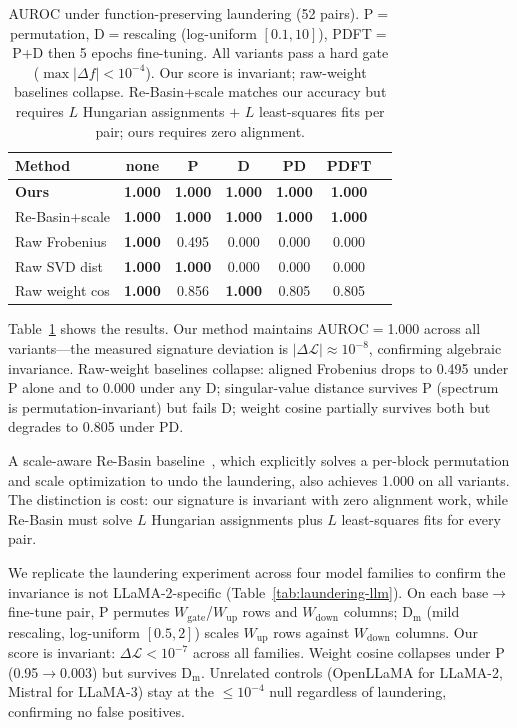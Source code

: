 \documentclass[letterpaper]{article}
\begin{document}
\begin{table}[t]
\centering
\small
\setlength{\tabcolsep}{4pt}
\begin{tabular}{@{}lcccccc@{}}
\toprule
Method & none & P & D & PD & PDFT \\
\midrule
\textbf{Ours} & \textbf{1.000} & \textbf{1.000} & \textbf{1.000} & \textbf{1.000} & \textbf{1.000} \\
Re-Basin+scale & \textbf{1.000} & \textbf{1.000} & \textbf{1.000} & \textbf{1.000} & \textbf{1.000} \\
Raw Frobenius & \textbf{1.000} & 0.495 & 0.000 & 0.000 & 0.000 \\
Raw SVD dist & \textbf{1.000} & \textbf{1.000} & 0.000 & 0.000 & 0.000 \\
Raw weight cos & \textbf{1.000} & 0.856 & \textbf{1.000} & 0.805 & 0.805 \\
\bottomrule
\end{tabular}
\caption{AUROC under function-preserving laundering (52 pairs). P$=$permutation, D$=$rescaling (log-uniform $[0.1, 10]$), PDFT$=$P+D then 5 epochs fine-tuning. All variants pass a hard gate ($\max|\Delta f| < 10^{-4}$). Our score is invariant; raw-weight baselines collapse. Re-Basin+scale matches our accuracy but requires $L$ Hungarian assignments $+$ $L$ least-squares fits per pair; ours requires zero alignment.}
\label{tab:laundering}
\end{table}

Table~\ref{tab:laundering} shows the results. Our method maintains AUROC$=$1.000 across all variants---the measured signature deviation is $|\Delta\mathcal{L}| \approx 10^{-8}$, confirming algebraic invariance. Raw-weight baselines collapse: aligned Frobenius drops to 0.495 under P alone and to 0.000 under any D; singular-value distance survives P (spectrum is permutation-invariant) but fails D; weight cosine partially survives both but degrades to 0.805 under PD.

A scale-aware Re-Basin baseline~\citep{ainsworth2023git}, which explicitly solves a per-block permutation and scale optimization to undo the laundering, also achieves 1.000 on all variants. The distinction is cost: our signature is invariant with zero alignment work, while Re-Basin must solve $L$ Hungarian assignments plus $L$ least-squares fits for every pair.

We replicate the laundering experiment across four model families to confirm the invariance is not LLaMA-2-specific (Table~\ref{tab:laundering-llm}). On each base$\to$fine-tune pair, P permutes $W_{\mathrm{gate}}$/$W_{\mathrm{up}}$ rows and $W_{\mathrm{down}}$ columns; D$_{\mathrm{m}}$ (mild rescaling, log-uniform $[0.5, 2]$) scales $W_{\mathrm{up}}$ rows against $W_{\mathrm{down}}$ columns. Our score is invariant: $\Delta\mathcal{L} < 10^{-7}$ across all families. Weight cosine collapses under P (0.95$\to$0.003) but survives D$_{\mathrm{m}}$. Unrelated controls (OpenLLaMA for LLaMA-2, Mistral for LLaMA-3) stay at the ${\leq}10^{-4}$ null regardless of laundering, confirming no false positives.
\end{document}
